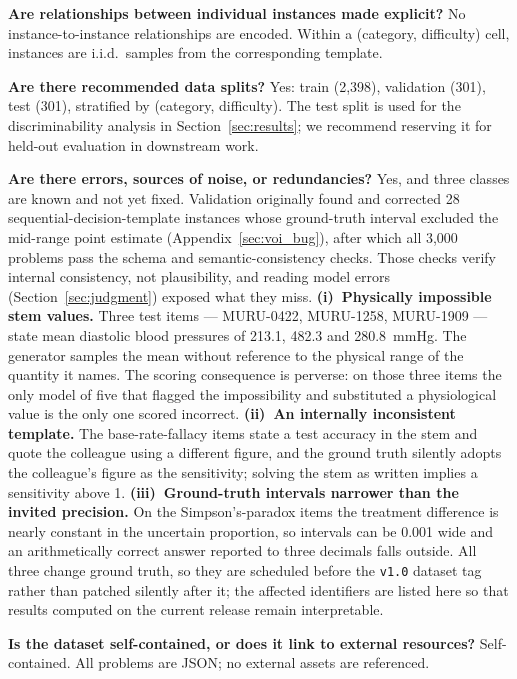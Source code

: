 \documentclass{article}
\begin{document}
\textbf{Are relationships between individual instances made explicit?}
No instance-to-instance relationships are encoded. Within a (category, difficulty) cell, instances are i.i.d.\ samples from the corresponding template.

\textbf{Are there recommended data splits?}
Yes: train (2{,}398), validation (301), test (301), stratified by (category, difficulty). The test split is used for the discriminability analysis in Section~\ref{sec:results}; we recommend reserving it for held-out evaluation in downstream work.

\textbf{Are there errors, sources of noise, or redundancies?}
Yes, and three classes are known and not yet fixed. Validation originally found and corrected 28 sequential-decision-template instances whose ground-truth interval excluded the mid-range point estimate (Appendix~\ref{sec:voi_bug}), after which all 3{,}000 problems pass the schema and semantic-consistency checks. Those checks verify internal consistency, not plausibility, and reading model errors (Section~\ref{sec:judgment}) exposed what they miss. \textbf{(i)~Physically impossible stem values.} Three test items --- MURU-0422, MURU-1258, MURU-1909 --- state mean diastolic blood pressures of 213.1, 482.3 and 280.8~mmHg. The generator samples the mean without reference to the physical range of the quantity it names. The scoring consequence is perverse: on those three items the only model of five that flagged the impossibility and substituted a physiological value is the only one scored incorrect. \textbf{(ii)~An internally inconsistent template.} The base-rate-fallacy items state a test accuracy in the stem and quote the colleague using a different figure, and the ground truth silently adopts the colleague's figure as the sensitivity; solving the stem as written implies a sensitivity above 1. \textbf{(iii)~Ground-truth intervals narrower than the invited precision.} On the Simpson's-paradox items the treatment difference is nearly constant in the uncertain proportion, so intervals can be 0.001 wide and an arithmetically correct answer reported to three decimals falls outside. All three change ground truth, so they are scheduled before the \texttt{v1.0} dataset tag rather than patched silently after it; the affected identifiers are listed here so that results computed on the current release remain interpretable.

\textbf{Is the dataset self-contained, or does it link to external resources?}
Self-contained. All problems are JSON; no external assets are referenced.
\end{document}
